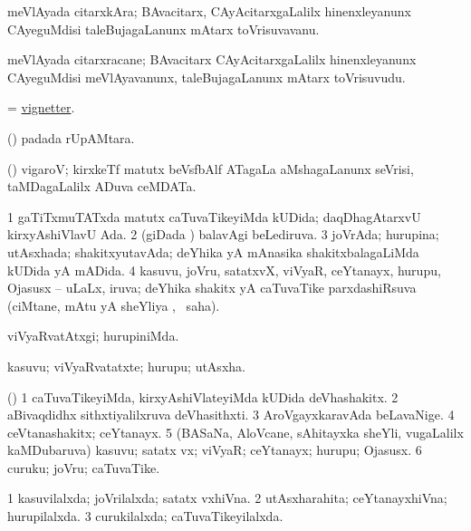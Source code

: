 \bentry
{} 
\gl{\nA}
\expl{}
\bmng
 meVlAyada citarxkAra; BAvacitarx, CAyAcitarxgaLalilx hinenxleyanunx CAyeguMdisi taleBujagaLanunx mAtarx toVrisuvavanu. 
\emng
\eentry

\bentry
{} 
\gl{\nA}
\expl{}
\bmng
 meVlAyada citarxracane; BAvacitarx CAyAcitarxgaLalilx hinenxleyanunx CAyeguMdisi meVlAyavanunx, taleBujagaLanunx mAtarx toVrisuvudu. 
\emng
\eentry

\bentry
{} 
\gl{\nA}
\expl{}
\bmng
 = \hyperlink{vignetter}{vignetter}. 
\emng
\eentry

\bentry
{} 
\gl{\nA}
\expl{}
\bmng
 (\ame)  padada rUpAMtara. 
\emng
\eentry

\bentry
{} 
\gl{\nA}
\expl{}
\bmng
 (\AseTxrXV) vigaroV; kirxkeTf matutx beVsfbAlf ATagaLa aMshagaLanunx seVrisi, taMDagaLalilx ADuva ceMDATa. 
\emng
\eentry

\bentry
{} 
\gl{\gu}
\expl{}
\bmng
\bnum
\num{1} gaTiTxmuTATxda matutx caTuvaTikeyiMda kUDida; daqDhagAtarxvU kirxyAshiVlavU Ada. 
\num{2} (giDada \vi) balavAgi beLediruva. 
\num{3} joVrAda; hurupina; utAsxhada; shakitxyutavAda; deYhika yA mAnasika shakitxbalagaLiMda kUDida yA mADida. 
\num{4} kasuvu, joVru, satatxvX, viVyaR, ceYtanayx, hurupu, Ojasusx -- uLaLx, iruva; deYhika shakitx yA caTuvaTike parxdashiRsuva (ciMtane, mAtu yA sheYliya \vi, \rUpa\ saha). 
\enum
\emng
\eentry

\bentry
{} 
\gl{\kirxvi}
\expl{}
\bmng
 viVyaRvatAtxgi; hurupiniMda. 
\emng
\eentry

\bentry
{} 
\gl{\nA}
\expl{}
\bmng
 kasuvu; viVyaRvatatxte; hurupu; utAsxha. 
\emng
\eentry

\bentry
{} 
\gl{\nA}
\expl{}
\bmng
 (\birx) 
\bnum
\num{1} caTuvaTikeyiMda, kirxyAshiVlateyiMda kUDida deVhashakitx. 
\num{2} aBivaqdidhx sithxtiyalilxruva deVhasithxti. 
\num{3} AroVgayxkaravAda beLavaNige. 
\num{4} ceVtanashakitx; ceYtanayx. 
\num{5} (BASaNa, AloVcane, sAhitayxka sheYli, \mo vugaLalilx kaMDubaruva) kasuvu; satatx vx; viVyaR; ceYtanayx; hurupu; Ojasusx. 
\num{6} curuku; joVru; caTuvaTike. 
\enum
\emng
\eentry

\bentry
{} 
\gl{\gu}
\expl{}
\bmng
\bnum
\num{1} kasuvilalxda; joVrilalxda; satatx vxhiVna. 
\num{2} utAsxharahita; ceYtanayxhiVna; hurupilalxda. 
\num{3} curukilalxda; caTuvaTikeyilalxda. 
\enum
\emng
\eentry

